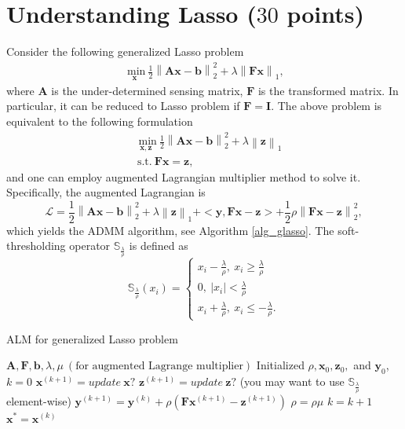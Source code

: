 \documentclass[10pt]{article}
\renewcommand{\mathbf}{\boldsymbol}
\newcommand{\mb}{\mathbf}
\newcommand{\Se}{\mathbb{S}}
\newcommand{\norm}[2]{\left\| #1 \right\|_{#2}}
\begin{document}
\section*{Understanding Lasso ($30$ points)}
Consider the following generalized Lasso problem
\begin{equation} \label{glasso}
\begin{aligned}
\underset{\mb{x}} {\text{ min}} \  \frac{1}{2} \norm{\mb{A}\mb{x}-\mb{b}}{2}^2 + \lambda \norm{\mb{F}\mb{x}}{1}, 
\end{aligned}
\end{equation}
where $\mb{A}$ is the under-determined sensing matrix, $\mb{F}$ is the transformed matrix. In particular, it can be reduced to Lasso problem if $\mb{F} = \mb{I}$. The above problem is equivalent to the following formulation
\begin{equation} \label{glasso_adm}
\begin{aligned}
&\underset{\mb{x}, \mb{z}} {\text{ min}} \  \frac{1}{2} \norm{\mb{A}\mb{x}-\mb{b}}{2}^2 + \lambda \norm{\mb{z}}{1} \\
& \ \text{s.t.} \ \mb{F}\mb{x} = \mb{z},
\end{aligned}
\end{equation}
and one can employ augmented Lagrangian multiplier method to solve it. Specifically, the augmented Lagrangian is 
\begin{equation*}
\mathcal{L} = \frac{1}{2} \norm{\mb{A}\mb{x}-\mb{b}}{2}^2 + \lambda \norm{\mb{z}}{1} + <\mb{y}, \mb{F}\mb{x}- \mb{z}> + \frac{1}{2} \rho \norm{\mb{F}\mb{x} - \mb{z}}{2}^2,
\end{equation*}
which yields the ADMM algorithm, see Algorithm \ref{alg_glasso}. The soft-thresholding operator $\Se_{\frac{\lambda}{\rho}}$ is defined as 
\begin{equation}
\Se_{\frac{\lambda}{\rho}} (x_i) = \begin{cases}
x_i - \frac{\lambda}{\rho}, \ x_i \geq \frac{\lambda}{\rho} \\
0, \ |x_i| < \frac{\lambda}{\rho} \\
x_i + \frac{\lambda}{\rho}, \ x_i \leq -\frac{\lambda}{\rho}.
\end{cases}
\end{equation} 
\begin{algorithm}[h]
	\caption{ALM for generalized Lasso problem}
	\label{alg_glasso}
	\begin{algorithmic}[1] 
		\REQUIRE $\mb{A}, \mb{F}, \mb{b}, \lambda, \mu \ (\text{for augmented Lagrange multiplier})$
		\STATE Initialized $\rho, \mb{x}_0, \mb{z}_0,$ and $\mb{y}_0$, $k = 0$
		\STATE $\mb{x}^{(k+1)} = update \ \mb{x} ?$
		\STATE $\mb{z}^{(k+1)} = update \ \mb{z} ?$ (you may want to use $\Se_{\frac{\lambda}{\rho}}$ element-wise)
		\STATE $\mb{y}^{(k+1)} = \mb{y}^{(k)} + \rho (\mb{F} \mb{x}^{(k+1)} - \mb{z}^{(k+1)})$
		\STATE $\rho = \rho \mu$
		\STATE $k = k + 1$
		\ENDWHILE
		\ENSURE $\mb{x}^{*} = \mb{x}^{(k)}$
	\end{algorithmic}
\end{algorithm}
\end{document}
